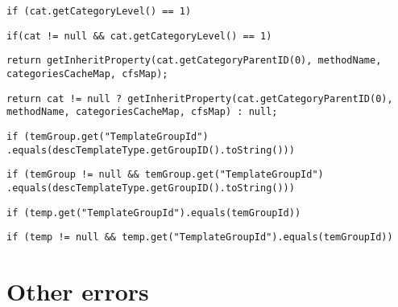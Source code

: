 \begin{lstlisting}[firstnumber=194, caption={getCategoryLevel invocation}]
if (cat.getCategoryLevel() == 1)
\end{lstlisting}
\begin{lstlisting}[firstnumber=194, caption={getCategoryLevel invocation possible solution}]
if(cat != null && cat.getCategoryLevel() == 1)
\end{lstlisting}
\noindent\makebox[\linewidth]{\rule{\linewidth}{0.4pt}}

\begin{lstlisting}[firstnumber=199, caption={getCategoryParentID invocation}]
return getInheritProperty(cat.getCategoryParentID(0), methodName, categoriesCacheMap, cfsMap);
\end{lstlisting}
\begin{lstlisting}[firstnumber=199, caption={getCategoryParentID invocation possible solution}]
return cat != null ? getInheritProperty(cat.getCategoryParentID(0), methodName, categoriesCacheMap, cfsMap) : null;
\end{lstlisting}
\noindent\makebox[\linewidth]{\rule{\linewidth}{0.4pt}}

\begin{lstlisting}[firstnumber=245, caption={get invocation}]
if (temGroup.get("TemplateGroupId") .equals(descTemplateType.getGroupID().toString()))
\end{lstlisting}
\begin{lstlisting}[firstnumber=245, caption={get invocation possible solution}]
if (temGroup != null && temGroup.get("TemplateGroupId") .equals(descTemplateType.getGroupID().toString()))
\end{lstlisting}
\noindent\makebox[\linewidth]{\rule{\linewidth}{0.4pt}}

\begin{lstlisting}[firstnumber=286, caption={get invocation}]
if (temp.get("TemplateGroupId").equals(temGroupId))
\end{lstlisting}
\begin{lstlisting}[firstnumber=286, caption={get invocation possible solution}]
if (temp != null && temp.get("TemplateGroupId").equals(temGroupId))
\end{lstlisting}
\noindent\makebox[\linewidth]{\rule{\linewidth}{0.4pt}}

\section{Other errors}

